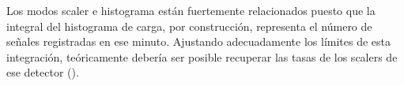 Los modos scaler e histograma están fuertemente relacionados puesto que la integral del histograma de carga, por construcción, representa el número de señales registradas en ese minuto. Ajustando adecuadamente los límites de esta integración, teóricamente debería ser posible recuperar las tasas de los scalers de ese detector (\cite{Martin_Schimassek2022}).